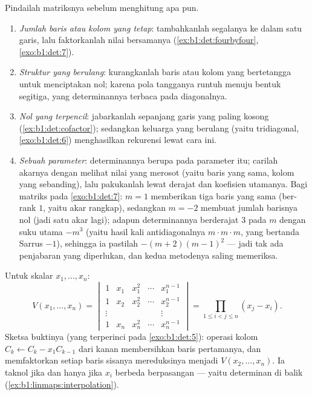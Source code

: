 \begin{method}
\label{met:b1:det:strategy}
Pindailah matriksnya sebelum menghitung apa pun.
\begin{enumerate}
  \item \emph{Jumlah baris atau kolom yang tetap}: tambahkanlah segalanya ke dalam
        satu garis, lalu faktorkanlah nilai bersamanya
        (\cref{ex:b1:det:fourbyfour}, \cref{exo:b1:det:7}).
  \item \emph{Struktur yang berulang}: kurangkanlah baris atau kolom yang
        bertetangga untuk menciptakan nol; karena pola tangganya runtuh
        menuju bentuk segitiga, yang determinannya terbaca pada
        diagonalnya.
  \item \emph{Nol yang terpencil}: jabarkanlah sepanjang garis yang paling kosong
        (\cref{ex:b1:det:cofactor}); sedangkan keluarga yang berulang
        (yaitu tridiagonal, \cref{exo:b1:det:6}) menghasilkan rekurensi lewat
        cara ini.
  \item \emph{Sebuah parameter}: determinannya berupa  pada
        parameter itu; carilah akarnya dengan melihat nilai yang merosot
        (yaitu baris yang sama, kolom yang sebanding), lalu pakukanlah
         lewat derajat dan koefisien utamanya. Bagi
        matriks pada \cref{exo:b1:det:7}: $m = 1$ memberikan tiga
        baris yang sama (ber-rank $1$, yaitu akar rangkap), sedangkan $m = -2$ membuat
        jumlah barisnya nol (jadi satu akar lagi); adapun determinannya
        berderajat $3$ pada $m$ dengan suku utama $-m^3$ (yaitu
        hasil kali antidiagonalnya $m\cdot m\cdot m$, yang bertanda
        Sarrus $-1$), sehingga ia pastilah $-(m+2)(m-1)^2$ --- jadi tak ada
        penjabaran yang diperlukan, dan kedua metodenya saling memeriksa.
\end{enumerate}
\end{method}

\begin{example}\label{ex:b1:det:vandermonde}
Untuk skalar $x_1, \dots, x_n$:
\[
V(x_1, \dots, x_n) =
\begin{vmatrix}
1 & x_1 & x_1^2 & \cdots & x_1^{n-1}\\
1 & x_2 & x_2^2 & \cdots & x_2^{n-1}\\
\vdots & & & & \vdots\\
1 & x_n & x_n^2 & \cdots & x_n^{n-1}
\end{vmatrix}
= \prod_{1 \leq i < j \leq n} (x_j - x_i) .
\]
Sketsa buktinya (yang terperinci pada \cref{exo:b1:det:5}): operasi kolom
$C_k \leftarrow C_k - x_1 C_{k-1}$ dari kanan membersihkan baris
pertamanya, dan memfaktorkan setiap baris sisanya mereduksinya menjadi
$V(x_2, \dots, x_n)$. Ia taknol jika dan hanya jika $x_i$ berbeda berpasangan
--- yaitu determinan di balik 
(\cref{ex:b1:linmaps:interpolation}).
\end{example}

